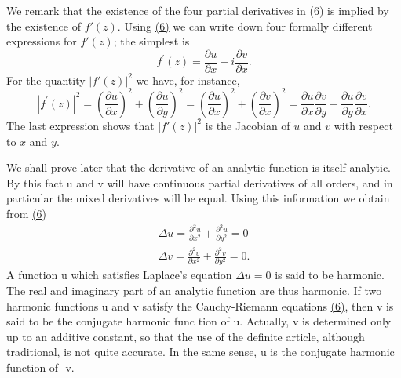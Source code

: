 We remark that the existence of the four partial derivatives in \hyperref[eq:2.6]{(6)} is implied by the existence of $f'(z)$. Using \hyperref[eq:2.6]{(6)} we can write down four formally different expressions for $f'(z)$; the simplest is
\begin{equation*}
f ^ {\prime} (z) = \frac {\partial u}{\partial x} + i \frac {\partial v}{\partial x}.
\end{equation*}
For the quantity $|f'(z)|^2$ we have, for instance,
\begin{equation*}
\left| f ^ {\prime} (z) \right| ^ {2} = \left(\frac {\partial u}{\partial x}\right) ^ {2} + \left(\frac {\partial u}{\partial y}\right) ^ {2} = \left(\frac {\partial u}{\partial x}\right) ^ {2} + \left(\frac {\partial v}{\partial x}\right) ^ {2} = \frac {\partial u}{\partial x} \frac {\partial v}{\partial y} - \frac {\partial u}{\partial y} \frac {\partial v}{\partial x}.
\end{equation*}
The last expression shows that $|f'(z)|^2$ is the Jacobian of $u$ and $v$ with respect to $x$ and $y$.

We shall prove later that the derivative of an analytic function is itself analytic. By this fact u and v will have continuous partial derivatives of all orders, and in particular the mixed derivatives will be equal. Using this information we obtain from \hyperref[eq:2.6]{(6)}
\begin{equation*}
\begin{array}{l} \Delta u = \frac {\partial^ {2} u}{\partial x ^ {2}} + \frac {\partial^ {2} u}{\partial y ^ {2}} = 0 \\ \Delta v = \frac {\partial^ {2} v}{\partial x ^ {2}} + \frac {\partial^ {2} v}{\partial y ^ {2}} = 0. \end{array}
\end{equation*}
A function u which satisfies Laplace's equation $\Delta u = 0$ is said to be harmonic. The real and imaginary part of an analytic function are thus harmonic. If two harmonic functions u and v satisfy the Cauchy-Riemann equations \hyperref[eq:2.6]{(6)}, then v is said to be the conjugate harmonic func%
\begingroup\renewcommand{\thefootnote}{}\endgroup%
%
tion of u. Actually, v is determined only up to an additive constant, so that the use of the definite article, although traditional, is not quite accurate. In the same sense, u is the conjugate harmonic function of -v.

